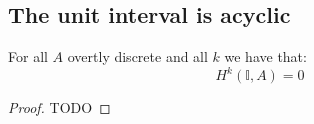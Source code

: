 \subsection{The unit interval is acyclic}

\begin{proposition}\label{vanishing-cohomology-interval}
For all $A$ overtly discrete and all $k$ we have that:
\[H^k(\mathbb{I},A) = 0\]
\end{proposition}

\begin{proof}
TODO
\end{proof}
